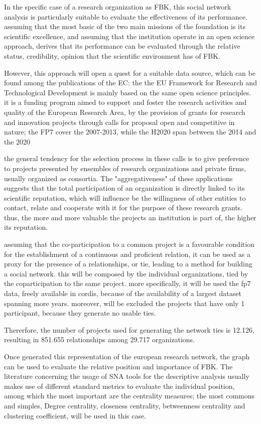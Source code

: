 In the specific case of a research organization as FBK, this social network analysis is particularly suitable to evaluate the effectiveness of its performance. assuming that the most basic of the two main missions of the foundation is its scientific excellence, and assuming that the institution operate in an open science approach, derives that its performance can be evaluated through the relative status, credibility, opinion that the scientific environment has of FBK.

However, this approach will open a quest for a suitable data source, which can be found among the publications of the EC: the the EU Framework for Research and Technological Development is mainly based on the same open science principles. it is a funding program aimed to support and foster the research activities and quality of the European Research Area, by the provision of grants for research and innovation projects through calls for proposal open and competitive in nature; the FP7 cover the 2007-2013, while the H2020 span between the 2014 and the 2020

the general tendency for the selection process in these calls is to give preference to projects presented by ensembles of research organizations and private firms, usually organized as consortia. The "aggregativeness" of these applications suggests that the total participation of an organization is directly linked to its scientific reputation, which will influence be the willingness of other entities to contact, relate and cooperate with it for the purpose of these research grants. thus, the more and more valuable the projects an institution is part of, the higher its reputation.

assuming that the co-participation to a common project is a favourable condition for the establishment of a continuous and proficient relation, it can be used as a proxy for the presence of a relationships, or tie, leading to a method for building a social network. this will be composed by the individual organizations, tied by the coparticipation to the same project. more specifically, it will be used the fp7 data, freely available in cordis, because of the availability of a largest dataset spanning more years. moreover, will be excluded the projects that have only 1 participant, because they generate no usable ties.

Thererfore, the number of projects used for generating the network ties is 12.126, resulting in 851.655 relationships among 29.717 organizations. 

Once generated this representation of the european research network, the graph can be used to evaluate the relative position and importance of FBK. The literature concerning the usage of SNA tools for the descriptive analysis usually makes use of different standard metrics to evaluate the individual position, among which the most important are the centrality measures; the most commons and simples, Degree centrality, closeness centrality, betweenness centrality and clustering coefficient, will be used in this case.

